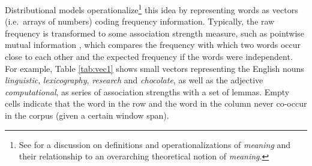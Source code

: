 \documentclass[
]{book}
\begin{document}
Distributional models operationalize\footnote{See \textcite{stefanowitsch_2010} for a discussion on definitions and operationalizations of \emph{meaning} and their relationship to an overarching theoretical notion of \emph{meaning}.
} this idea by representing words as vectors (i.e.~arrays of numbers) coding frequency information. Typically, the raw frequency is transformed to some association strength measure, such as pointwise mutual information \autocite[PMI, see][]{church.hanks_1989}, which compares the frequency with which two words occur close to each other and the expected frequency if the words were independent. For example, Table \ref{tab:vec1} shows small vectors representing the English nouns \emph{linguistic}, \emph{lexicography}, \emph{research} and \emph{chocolate}, as well as the adjective \emph{computational}, as series of association strengths with a set of lemmas. Empty cells indicate that the word in the row and the word in the column never co-occur in the corpus (given a certain window span).

\providecommand{\docline}[3]{\noalign{\global\setlength{\arrayrulewidth}{#1}}\arrayrulecolor[HTML]{#2}\cline{#3}}

\setlength{\tabcolsep}{2pt}

\renewcommand*{\arraystretch}{1.5}
\end{document}
